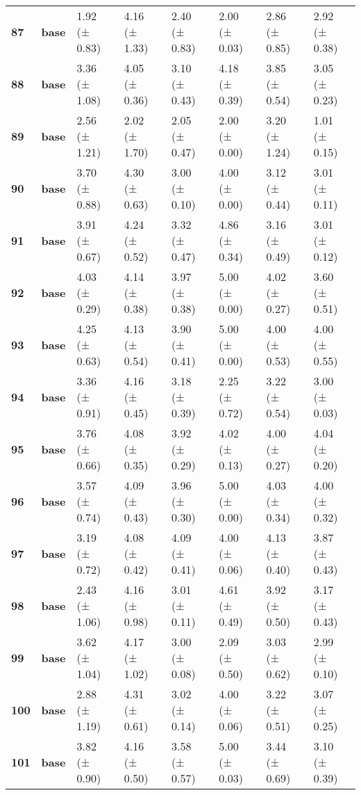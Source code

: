 \begin{longtable}{llllllll}
\cline{1-8}
\textbf{87} & \textbf{base} & 1.92 (± 0.83) & 4.16 (± 1.33) & 2.40 (± 0.83) & 2.00 (± 0.03) & 2.86 (± 0.85) & 2.92 (± 0.38) \\
\cline{1-8}
\textbf{88} & \textbf{base} & 3.36 (± 1.08) & 4.05 (± 0.36) & 3.10 (± 0.43) & 4.18 (± 0.39) & 3.85 (± 0.54) & 3.05 (± 0.23) \\
\cline{1-8}
\textbf{89} & \textbf{base} & 2.56 (± 1.21) & 2.02 (± 1.70) & 2.05 (± 0.47) & 2.00 (± 0.00) & 3.20 (± 1.24) & 1.01 (± 0.15) \\
\cline{1-8}
\textbf{90} & \textbf{base} & 3.70 (± 0.88) & 4.30 (± 0.63) & 3.00 (± 0.10) & 4.00 (± 0.00) & 3.12 (± 0.44) & 3.01 (± 0.11) \\
\cline{1-8}
\textbf{91} & \textbf{base} & 3.91 (± 0.67) & 4.24 (± 0.52) & 3.32 (± 0.47) & 4.86 (± 0.34) & 3.16 (± 0.49) & 3.01 (± 0.12) \\
\cline{1-8}
\textbf{92} & \textbf{base} & 4.03 (± 0.29) & 4.14 (± 0.38) & 3.97 (± 0.38) & 5.00 (± 0.00) & 4.02 (± 0.27) & 3.60 (± 0.51) \\
\cline{1-8}
\textbf{93} & \textbf{base} & 4.25 (± 0.63) & 4.13 (± 0.54) & 3.90 (± 0.41) & 5.00 (± 0.00) & 4.00 (± 0.53) & 4.00 (± 0.55) \\
\cline{1-8}
\textbf{94} & \textbf{base} & 3.36 (± 0.91) & 4.16 (± 0.45) & 3.18 (± 0.39) & 2.25 (± 0.72) & 3.22 (± 0.54) & 3.00 (± 0.03) \\
\cline{1-8}
\textbf{95} & \textbf{base} & 3.76 (± 0.66) & 4.08 (± 0.35) & 3.92 (± 0.29) & 4.02 (± 0.13) & 4.00 (± 0.27) & 4.04 (± 0.20) \\
\cline{1-8}
\textbf{96} & \textbf{base} & 3.57 (± 0.74) & 4.09 (± 0.43) & 3.96 (± 0.30) & 5.00 (± 0.00) & 4.03 (± 0.34) & 4.00 (± 0.32) \\
\cline{1-8}
\textbf{97} & \textbf{base} & 3.19 (± 0.72) & 4.08 (± 0.42) & 4.09 (± 0.41) & 4.00 (± 0.06) & 4.13 (± 0.40) & 3.87 (± 0.43) \\
\cline{1-8}
\textbf{98} & \textbf{base} & 2.43 (± 1.06) & 4.16 (± 0.98) & 3.01 (± 0.11) & 4.61 (± 0.49) & 3.92 (± 0.50) & 3.17 (± 0.43) \\
\cline{1-8}
\textbf{99} & \textbf{base} & 3.62 (± 1.04) & 4.17 (± 1.02) & 3.00 (± 0.08) & 2.09 (± 0.50) & 3.03 (± 0.62) & 2.99 (± 0.10) \\
\cline{1-8}
\textbf{100} & \textbf{base} & 2.88 (± 1.19) & 4.31 (± 0.61) & 3.02 (± 0.14) & 4.00 (± 0.06) & 3.22 (± 0.51) & 3.07 (± 0.25) \\
\cline{1-8}
\textbf{101} & \textbf{base} & 3.82 (± 0.90) & 4.16 (± 0.50) & 3.58 (± 0.57) & 5.00 (± 0.03) & 3.44 (± 0.69) & 3.10 (± 0.39) \\

\end{longtable}
